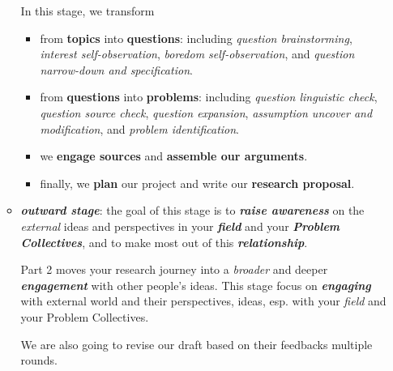 \documentclass[11pt]{article}
\begin{document}
\begin{itemize}
\begin{itemize}
In this stage, we transform
\begin{itemize}
\item from \textbf{topics} into \textbf{questions}: including \emph{question brainstorming}, \emph{interest self-observation}, \emph{boredom self-observation}, and \emph{question narrow-down and specification}.

\item from \textbf{questions} into \textbf{problems}: including \emph{question linguistic check}, \emph{question source check}, \emph{question expansion}, \emph{assumption uncover and modification}, and \emph{problem identification}. 

\item we \textbf{engage sources} and \textbf{assemble our arguments}.
\item finally, we \textbf{plan} our project and write our \textbf{research proposal}.
\end{itemize}

\item \emph{\textbf{outward stage}}: the goal of this stage is to \emph{\textbf{raise awareness}} on the \emph{external} ideas and perspectives in your \emph{\textbf{field}} and your \emph{\textbf{Problem Collectives}}, and to make most out of this \emph{\textbf{relationship}}. 

Part 2 moves your research journey into a \emph{broader} and deeper \emph{\textbf{engagement}} with other people’s ideas.  This stage focus on \emph{\textbf{engaging}} with external world and their perspectives, ideas, esp. with your \emph{field} and your Problem Collectives. 

We are also going to revise our draft based on their feedbacks multiple rounds.
\end{itemize}
\end{itemize}
\end{document}
